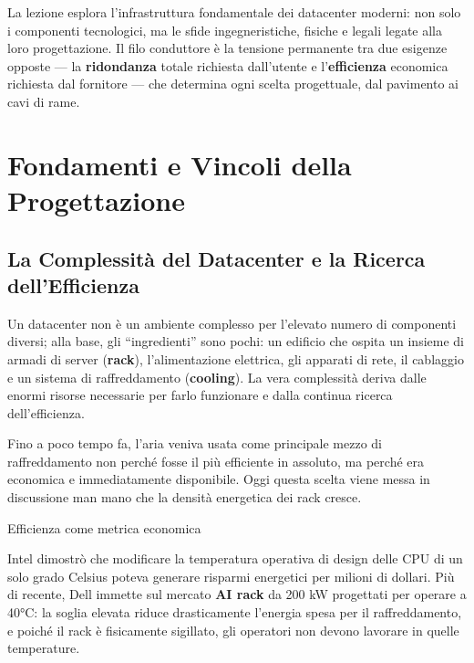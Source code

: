 \documentclass[
  italian,
  openany]{book}
\begin{document}
La lezione esplora l'infrastruttura fondamentale dei datacenter moderni:
non solo i componenti tecnologici, ma le sfide ingegneristiche, fisiche
e legali legate alla loro progettazione. Il filo conduttore è la
tensione permanente tra due esigenze opposte --- la \textbf{ridondanza}
totale richiesta dall'utente e l'\textbf{efficienza} economica richiesta
dal fornitore --- che determina ogni scelta progettuale, dal pavimento
ai cavi di rame.

\section{Fondamenti e Vincoli della
Progettazione}\label{fondamenti-e-vincoli-della-progettazione}

\subsection{La Complessità del Datacenter e la Ricerca
dell'Efficienza}\label{la-complessituxe0-del-datacenter-e-la-ricerca-dellefficienza}

Un datacenter non è un ambiente complesso per l'elevato numero di
componenti diversi; alla base, gli ``ingredienti'' sono pochi: un
edificio che ospita un insieme di armadi di server (\textbf{rack}),
l'alimentazione elettrica, gli apparati di rete, il cablaggio e un
sistema di raffreddamento (\textbf{cooling}). La vera complessità deriva
dalle enormi risorse necessarie per farlo funzionare e dalla continua
ricerca dell'efficienza.

Fino a poco tempo fa, l'aria veniva usata come principale mezzo di
raffreddamento non perché fosse il più efficiente in assoluto, ma perché
era economica e immediatamente disponibile. Oggi questa scelta viene
messa in discussione man mano che la densità energetica dei rack cresce.

\begin{callouttip}{Efficienza come metrica economica}

Intel dimostrò che modificare la temperatura operativa di design delle
CPU di un solo grado Celsius poteva generare risparmi energetici per
milioni di dollari. Più di recente, Dell immette sul mercato \textbf{AI
rack} da 200 kW progettati per operare a 40°C: la soglia elevata riduce
drasticamente l'energia spesa per il raffreddamento, e poiché il rack è
fisicamente sigillato, gli operatori non devono lavorare in quelle
temperature.

\end{callouttip}
\end{document}
